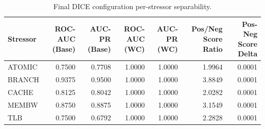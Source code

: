 \begin{table}[t]
\centering
\caption{Final DICE configuration per-stressor separability.}
\label{tab:dice_full_stressor}
\footnotesize
\begin{tabular}{lrrrrrr}
\toprule
Stressor & ROC-AUC (Base) & AUC-PR (Base) & ROC-AUC (WC) & AUC-PR (WC) & Pos/Neg Score Ratio & Pos-Neg Score Delta \\
\midrule
ATOMIC & 0.7500 & 0.7708 & 1.0000 & 1.0000 & 1.9964 & 0.0001 \\
BRANCH & 0.9375 & 0.9500 & 1.0000 & 1.0000 & 3.8849 & 0.0001 \\
CACHE & 0.8125 & 0.8042 & 1.0000 & 1.0000 & 2.0282 & 0.0001 \\
MEMBW & 0.8750 & 0.8875 & 1.0000 & 1.0000 & 3.1549 & 0.0001 \\
TLB & 0.7500 & 0.6792 & 1.0000 & 1.0000 & 2.2828 & 0.0001 \\
\bottomrule
\end{tabular}

\end{table}
